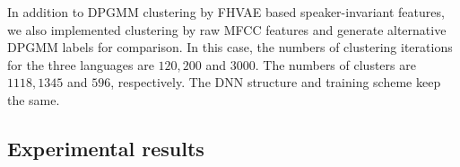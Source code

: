 \documentclass[a4paper]{article}
\begin{document}
In addition to  DPGMM clustering by FHVAE based speaker-invariant features, we also implemented clustering by raw MFCC features and generate alternative DPGMM labels  for comparison. In this case, the numbers of clustering iterations for the three languages are $120,200$ and $3000$.
The numbers of clusters are 
$1118, 1345$ and $596$,
respectively. The DNN  structure and training scheme keep the same.

\label{subsec:zs2017_setup}
\subsection{Experimental results}
\end{document}
